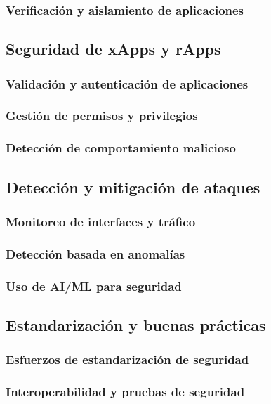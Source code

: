 \documentclass[11pt,a4paper]{article}
\makeatletter
\let\ORIGsubsection\subsection
\def\subsection{\@nobreakfalse\ORIGsubsection}
\let\ORIGsubsubsection\subsubsection
\def\subsubsection{\@nobreakfalse\ORIGsubsubsection}
\makeatother
\begin{document}
\subsubsection{Verificación y aislamiento de aplicaciones}

\subsection{Seguridad de xApps y rApps}

\subsubsection{Validación y autenticación de aplicaciones}
\subsubsection{Gestión de permisos y privilegios}
\subsubsection{Detección de comportamiento malicioso}

\subsection{Detección y mitigación de ataques}

\subsubsection{Monitoreo de interfaces y tráfico}
\subsubsection{Detección basada en anomalías}
\subsubsection{Uso de AI/ML para seguridad}

\subsection{Estandarización y buenas prácticas}

\subsubsection{Esfuerzos de estandarización de seguridad}
\subsubsection{Interoperabilidad y pruebas de seguridad}
\end{document}
